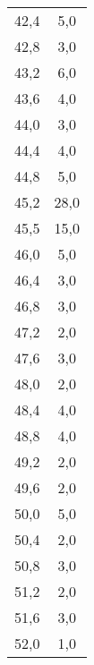 \begin{longtable}{cc}
42,4	&5,0\\
42,8	&3,0\\
43,2	&6,0\\
43,6	&4,0\\
44,0	&3,0\\
44,4	&4,0\\
44,8	&5,0\\
45,2	&28,0\\
45,5	&15,0\\
46,0	&5,0\\
46,4	&3,0\\
46,8	&3,0\\
47,2	&2,0\\
47,6	&3,0\\
48,0	&2,0\\
48,4	&4,0\\
48,8	&4,0\\
49,2	&2,0\\
49,6	&2,0\\
50,0	&5,0\\
50,4	&2,0\\
50,8	&3,0\\
51,2	&2,0\\
51,6	&3,0\\
52,0	&1,0\\
\end{longtable}
